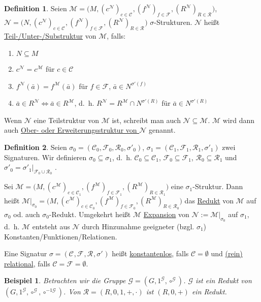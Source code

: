 \documentclass{article}
\theoremstyle{definition}
\newtheorem{dfn}{Definition}[section]
\theoremstyle{plain}
\newtheorem*{bsp}{Beispiel}
\newcommand{\m}[1]{\mathcal{#1}}
\newcommand{\sign}[1]{(\m{C}_{#1}, \m{F}_{#1}, \m{R}_{#1}, \sigma'_{#1})}
\newcommand{\struc}[3]{\big(#1, (c^{#2})_{c \in \m{C}_{#3}}, (f^{#2})_{f \in \m{F}_{#3}}, (R^{#2})_{R \in \m{R}_{#3}}\big)}
\begin{document}
    \begin{dfn}
        Seien $ \m{M} = \struc{M}{\m{N}}{} $, $ \m{N} = \struc{N}{\m{N}}{} $ $\sigma $-Strukturen.
        $ \m{N} $ heißt \underline{Teil-/Unter-/Substruktur} von $ \m{M} $, falls:
        \begin{enumerate}
            \item $ N \subseteq M $
            \item $ c^\m{N} = c^\m{M} $ für $ c \in \m{C} $
            \item $ f^\m{N}(\bar{a}) = f^\m{M}(\bar{a}) $ für $ f \in \m{F} $, $ \bar{a} \in N^{\sigma'(f)} $
            \item $ \bar{a} \in R^\m{N} \Leftrightarrow \bar{a} \in R^\m{M} $, d.~h. $ R^\m{N} = R^\m{M} \cap N^{\sigma'(R)} $ für $ \bar{a} \in N^{\sigma'(R)} $
        \end{enumerate}

            Wenn $ \m{N} $ eine Teilstruktur von $ \m{M} $ ist, schreibt man auch $ \m{N} \subseteq \m{M} $.
            $ \m{M} $ wird dann auch \underline{Ober- oder Erweiterungsstruktur von $ \m{N} $} genannt.
    \end{dfn}

    \begin{dfn}
        Seien $ \sigma_0 = \sign{0} $, $ \sigma_1 = \sign{1} $ zwei Signaturen.
        Wir definieren $ \sigma_0 \subseteq \sigma_1 $, d.~h. $ \m{C}_0 \subseteq \m{C}_1 $, $ \m{F}_0 \subseteq \m{F}_1 $, $ \m{R}_0 \subseteq \m{R}_1 $ und $ \sigma'_0 = \sigma'_1 \vert_{\m{F}_0 \cup \m{R}_0} $ .

        Sei $ \m{M} = \struc{M}{\m{M}}{1} $ eine $ \sigma_1 $-Struktur.
        Dann heißt $ \m{M} \vert_{\sigma_0} = \struc{M}{\m{M}}{0} $ das \underline{Redukt} von $ \m{M} $ auf $ \sigma_0 $ od. auch $ \sigma_0 $-Redukt.
        Umgekehrt heißt $ \m{M} $ \underline{Expansion} von $ \m{N} := \m{M} \vert_{\sigma_0} $ auf $ \sigma_1 $, d.~h. $ \m{M} $ entsteht aus $ \m{N} $ durch Hinzunahme geeigneter (bzgl. $ \sigma_1 $) Konstanten/Funktionen/Relationen.

        Eine Signatur $ \sigma = \sign{} $ heißt \underline{konstantenlos}, falls $ \m{C} = \emptyset $ und \underline{(rein) relational}, falls $ \m{C} = \m{F} = \emptyset $.
    \end{dfn}

    \begin{bsp}
        Betrachten wir die Gruppe $ \m{G} = (G, 1^\m{G}, \circ^\m{G}) $.
        $ \m{G} $ ist ein Redukt von $ (G, 1^\m{G}, \circ^\m{G}, \circ^{-1\m{G}}) $.
        Von $ \m{R} = (R, 0, 1, +, \cdot) $ ist $ (R, 0, +) $ ein Redukt.
    \end{bsp}
\end{document}

